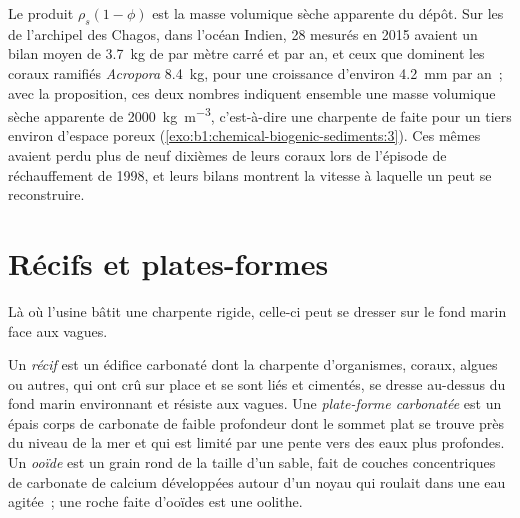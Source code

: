 Le produit $\rho_s(1-\phi)$ est la masse volumique sèche apparente du dépôt. Sur
les  de l'archipel des Chagos, dans l'océan Indien, 28  mesurés en 2015
avaient un bilan moyen de \qty{3.7}{kg} de  par mètre carré et par
an, et ceux que dominent les coraux ramifiés \emph{Acropora} \qty{8.4}{kg},
pour une croissance d'environ \qty{4.2}{mm} par an~; avec la proposition, ces deux nombres
indiquent ensemble une masse volumique sèche apparente de \qty{2000}{kg.m^{-3}}, c'est-à-dire une
charpente de  faite pour un tiers environ d'espace poreux (\cref{exo:b1:chemical-biogenic-sediments:3}).
Ces mêmes  avaient perdu plus de neuf dixièmes de leurs coraux lors de l'épisode de
réchauffement de 1998, et leurs bilans montrent la vitesse à laquelle un  peut se reconstruire.

\section{Récifs et plates-formes}\label{sec:b1:chemical-biogenic-sediments:reefs}

Là où l'usine bâtit une charpente rigide, celle-ci peut se dresser sur le fond marin
face aux vagues.

\begin{definition}\label{def:b1:chemical-biogenic-sediments:reef}
Un \emph{récif} est un édifice carbonaté dont la charpente d'organismes,
coraux, algues ou autres, qui ont crû sur place et se sont liés et cimentés, se dresse
au-dessus du fond marin environnant et résiste aux vagues. Une \emph{plate-forme
carbonatée} est un épais corps de carbonate
de faible profondeur dont le sommet plat se trouve près du niveau de la mer et qui est limité par une pente vers
des eaux plus profondes. Un \emph{ooïde} est un grain rond de la taille d'un sable, fait de
couches concentriques de carbonate de calcium développées autour d'un noyau qui roulait dans
une eau agitée~; une roche faite d'ooïdes est une oolithe.
\end{definition}

